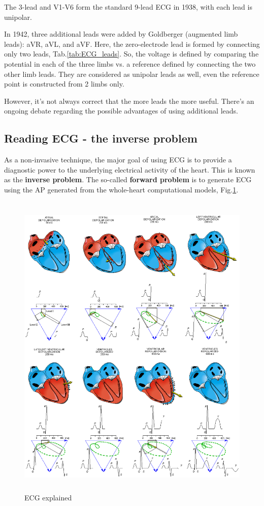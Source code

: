 The 3-lead and V1-V6 form the standard 9-lead ECG in 1938, with each lead is
unipolar.

In 1942, three additional leads were added by Goldberger (augmented limb leads):
aVR, aVL, and aVF. Here, the zero-electrode lead is formed by connecting only
two leads, Tab.\ref{tab:ECG_leads}. So, the voltage is defined by comparing the
potential in each of the three limbs vs. a reference defined by connecting the two other limb leads.
They are considered as unipolar leads as well, even the reference point is
constructed from 2 limbs only.

However, it's not always correct that the more leads the more useful.
There's an ongoing debate regarding the possible advantages of using additional
leads.

\subsection{Reading ECG - the inverse problem}

As a non-invasive technique, the major goal of using ECG is to provide
a diagnostic power to the underlying electrical activity of the heart. This is
known as the {\bf inverse problem}. The so-called {\bf forward problem} is to
generate ECG using the AP generated from the whole-heart computational models,
Fig.\ref{fig:ECG_explained}.

\begin{figure}[hbt]
  \centerline{\includegraphics[height=15cm,
    angle=0]{./images/ECG_explained.eps}}
  \caption{ECG explained}
  \label{fig:ECG_explained}
\end{figure}


